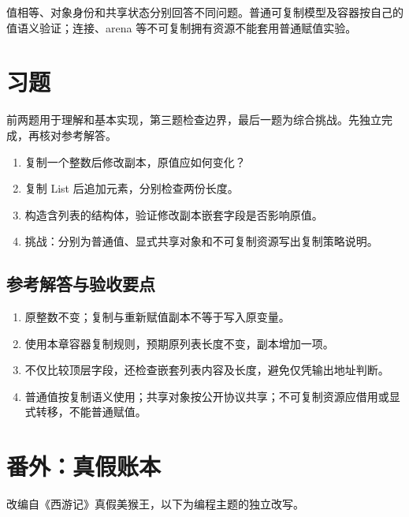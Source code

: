 值相等、对象身份和共享状态分别回答不同问题。普通可复制模型及容器按自己的值语义验证；连接、arena 等不可复制拥有资源不能套用普通赋值实验。

\section{习题}

前两题用于理解和基本实现，第三题检查边界，最后一题为综合挑战。先独立完成，再核对参考解答。

\begin{enumerate}

\item 复制一个整数后修改副本，原值应如何变化？

\item 复制 List 后追加元素，分别检查两份长度。

\item 构造含列表的结构体，验证修改副本嵌套字段是否影响原值。

\item 挑战：分别为普通值、显式共享对象和不可复制资源写出复制策略说明。

\end{enumerate}

\subsection*{参考解答与验收要点}

\begin{enumerate}

\item 原整数不变；复制与重新赋值副本不等于写入原变量。

\item 使用本章容器复制规则，预期原列表长度不变，副本增加一项。

\item 不仅比较顶层字段，还检查嵌套列表内容及长度，避免仅凭输出地址判断。

\item 普通值按复制语义使用；共享对象按公开协议共享；不可复制资源应借用或显式转移，不能普通赋值。

\end{enumerate}

\section{番外：真假账本}

改编自《西游记》真假美猴王，以下为编程主题的独立改写。

